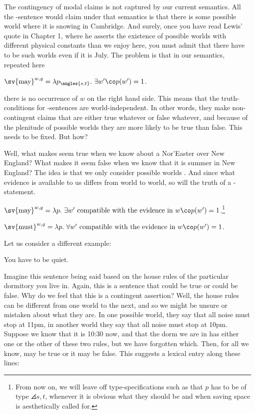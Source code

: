 The contingency of modal claims is not captured by our current
semantics. All the -sentence would claim under that
semantics is that there is some possible world where it is snowing in
Cambridge. And surely, once you have read Lewis' quote in Chapter 1,
where he asserts the existence of possible worlds with different
physical constants than we enjoy here, you must admit that there have
to be such worlds even if it is July. The problem is that in our
semantics, repeated here

\ex $\sv{\mbox{may}}^{w,g} = \lambda p_{\angles{s,t}}.\ \exists w'\co p(w') =
1$. \xe

there is no occurrence of $w$ on the right hand side. This means that the
truth-conditions for -sentences are world-independent.
In other words, they make non-contingent claims that are
either true whatever or false whatever, and because of the plenitude of possible
worlds they are more likely to be true than false. This needs to be fixed. But
how?

Well, what makes  seem true
when we know about a Nor'Easter over New England? What makes it seem
false when we know that it is summer in New England? The idea is that
we only consider possible worlds . And since what evidence is available to us differs
from world to world, so will the truth of a
-statement.

\ex $\sv{\mbox{may}}^{w,g} = \lambda p.\ \exists w' \mbox{ compatible with the
  evidence in } w\co p(w') = 1$.\footnote{From now on, we will leave off
  type-specifications such as that $p$ has to be of type $\angles{s,t}$,
  whenever it is obvious what they should be and when saving space is
  aesthetically called for.} \xe

\ex $\sv{\mbox{must}}^{w,g} = \lambda p.\ \forall w' \mbox{ compatible with the
  evidence in } w\co p(w') = 1$. \xe

Let us consider a different example:

\ex You have to be quiet. \xe

Imagine this sentence being said based on the house rules of the
particular dormitory you live in. Again, this is a sentence that could
be true or could be false. Why do we feel that this is a contingent
assertion? Well, the house rules can be different from one world to
the next, and so we might be unsure or mistaken about what they are.
In one possible world, they say that all noise must stop at 11pm, in
another world they say that all noise must stop at 10pm. Suppose we
know that it is 10:30 now, and that the dorm we are in has either one
or the other of these two rules, but we have forgotten which. Then,
for all we know,  may be true or it
may be false. This suggests a lexical entry along these lines:

